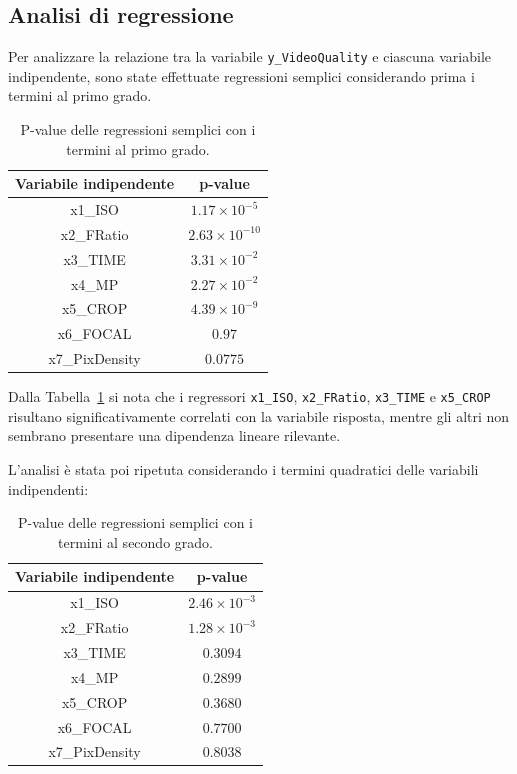 \subsection{Analisi di regressione}
Per analizzare la relazione tra la variabile \texttt{y\_VideoQuality} e ciascuna variabile indipendente, sono state effettuate regressioni semplici considerando prima i termini al primo grado.

\begin{table}[H]
	\centering
	\begin{tabular}{|c|c|}
		\hline
		\textbf{Variabile indipendente} & \textbf{p-value} \\
		\hline
		x1\_ISO & $1.17 \times 10^{-5}$ \\
		\hline
		x2\_FRatio & $2.63 \times 10^{-10}$ \\ 
		\hline
		x3\_TIME & $3.31 \times 10^{-2}$ \\
		\hline
		x4\_MP & $2.27 \times 10^{-2}$ \\
		\hline
		x5\_CROP & $4.39 \times 10^{-9}$ \\
		\hline
		x6\_FOCAL & $0.97$ \\
		\hline
		x7\_PixDensity & $0.0775$ \\
		\hline
	\end{tabular}
	\caption{P-value delle regressioni semplici con i termini al primo grado.}
	\label{tab:reg_lin_1grado}
\end{table}

Dalla Tabella~\ref{tab:reg_lin_1grado} si nota che i regressori \texttt{x1\_ISO}, \texttt{x2\_FRatio}, \texttt{x3\_TIME} e \texttt{x5\_CROP} risultano significativamente correlati con la variabile risposta, mentre gli altri non sembrano presentare una dipendenza lineare rilevante.

L’analisi è stata poi ripetuta considerando i termini quadratici delle variabili indipendenti:

\begin{table}[H]
	\centering
	\begin{tabular}{|c|c|}
		\hline
		\textbf{Variabile indipendente} & \textbf{p-value} \\
		\hline
		x1\_ISO & $2.46 \times 10^{-3}$ \\
		\hline
		x2\_FRatio & $1.28 \times 10^{-3}$ \\ 
		\hline
		x3\_TIME & $0.3094$ \\
		\hline
		x4\_MP & $0.2899$ \\
		\hline
		x5\_CROP & $0.3680$ \\
		\hline
		x6\_FOCAL & $0.7700$ \\
		\hline
		x7\_PixDensity & $0.8038$ \\
		\hline
	\end{tabular}
	\caption{P-value delle regressioni semplici con i termini al secondo grado.}
	\label{tab:reg_lin_2grado}
\end{table}

